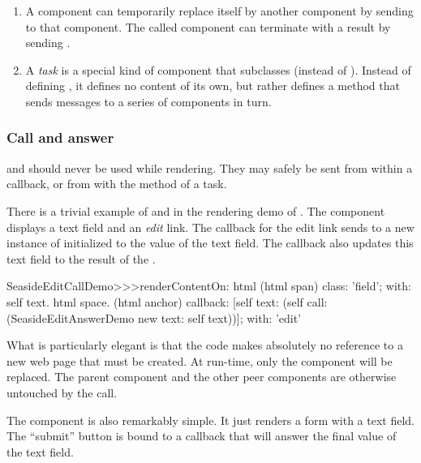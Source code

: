 \documentclass[a4paper,10pt,twoside]{book}
\begin{document}
\begin{enumerate}
  \item A component can temporarily replace itself by another component by sending  to that component.
  The called component can terminate with a result by sending .

  \item A \emph{task} is a special kind of component that subclasses  (instead of ).
  Instead of defining , it defines no content of its own, but rather defines a  method that sends  messages to a series of components in turn.
\end{enumerate}

\subsubsection{Call and answer}

 and  should never be used while rendering.
They may safely be sent from within a callback, or from with the  method of a task.

There is a trivial example of  and  in the rendering demo of .
The component  displays a text field and an \emph{edit} link.
The callback for the edit link sends  to a new instance of  initialized to the value of the text field.
The callback also updates this text field to the result of the .

\begin{code}{}
SeasideEditCallDemo>>>renderContentOn: html 
	(html span)
		class: 'field';
		with: self text.
	html space.
	(html anchor)
		callback: 
				[self text: (self call: (SeasideEditAnswerDemo new text: self text))];
		with: 'edit'
\end{code}{}

What is particularly elegant is that the code makes absolutely no reference to a new web page that must be created.
At run-time, only the  component will be replaced.
The parent component and the other peer components are otherwise untouched by the call.

The  component is also remarkably simple.
It just renders a form with a text field.
The ``submit'' button is bound to a callback that will answer the final value of the text field.
\end{document}
